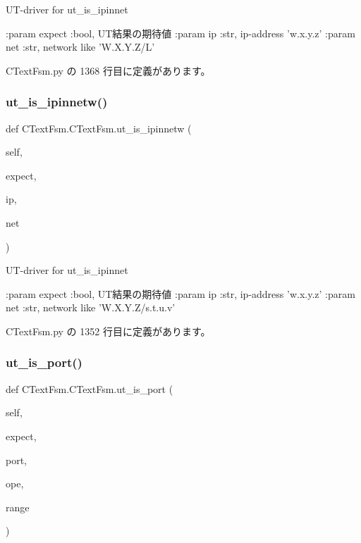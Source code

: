 \begin{DoxyVerb}UT-driver for ut_is_ipinnet

:param expect :bool, UT結果の期待値
:param ip     :str, ip-address   'w.x.y.z'
:param net    :str, network like 'W.X.Y.Z/L'
\end{DoxyVerb}
 

 C\+Text\+Fsm.\+py の 1368 行目に定義があります。

\mbox{\label{classCTextFsm_1_1CTextFsm_a2e1e78dbb799c91a8174c09aab2ca30b}} 
\subsubsection{\texorpdfstring{ut\_is\_ipinnetw()}{ut\_is\_ipinnetw()}}
{\footnotesize\ttfamily def C\+Text\+Fsm.\+C\+Text\+Fsm.\+ut\+\_\+is\+\_\+ipinnetw (\begin{DoxyParamCaption}\item[{}]{self,  }\item[{}]{expect,  }\item[{}]{ip,  }\item[{}]{net }\end{DoxyParamCaption})}

\begin{DoxyVerb}UT-driver for ut_is_ipinnet

:param expect :bool, UT結果の期待値
:param ip     :str, ip-address   'w.x.y.z'
:param net    :str, network like 'W.X.Y.Z/s.t.u.v'
\end{DoxyVerb}
 

 C\+Text\+Fsm.\+py の 1352 行目に定義があります。

\mbox{\label{classCTextFsm_1_1CTextFsm_a9cec3d73733c16ef6bb8d83724454b32}} 
\subsubsection{\texorpdfstring{ut\_is\_port()}{ut\_is\_port()}}
{\footnotesize\ttfamily def C\+Text\+Fsm.\+C\+Text\+Fsm.\+ut\+\_\+is\+\_\+port (\begin{DoxyParamCaption}\item[{}]{self,  }\item[{}]{expect,  }\item[{}]{port,  }\item[{}]{ope,  }\item[{}]{range }\end{DoxyParamCaption})}

